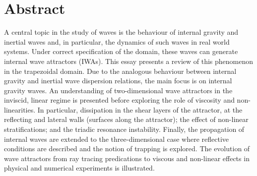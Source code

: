 \documentclass[a4paper]{article}
\numberwithin{equation}{section}
\begin{document}
\newpage
\thispagestyle{empty}
\section*{Abstract}

A central topic in the study of waves is the behaviour of internal gravity and inertial waves and, in particular, the dynamics of such waves in real world systems. Under correct specification of the domain, these waves can generate internal wave attractors (IWAs). This essay presents a review of this phenomenon in the trapezoidal domain. Due to the analogous behaviour between internal gravity and inertial wave dispersion relations, the main focus is on internal gravity waves. An understanding of two-dimensional wave attractors in the inviscid, linear regime is presented before exploring the role of viscosity and non-linearities. In particular, dissipation in the shear layers of the attractor, at the reflecting and lateral walls (surfaces along the attractor); the effect of non-linear stratifications; and the triadic resonance instability. Finally, the propagation of internal waves are extended to the three-dimensional case where reflective conditions are described and the notion of trapping is explored. The evolution of wave attractors from ray tracing predications to viscous and non-linear effects in physical and numerical experiments is illustrated.

\newpage
\thispagestyle{empty}
\renewcommand{\baselinestretch}{1.34}\normalsize
\tableofcontents
\renewcommand{\baselinestretch}{1.0}\normalsize

\thispagestyle{empty}

\newpage
\setcounter{page}{1}
\end{document}
